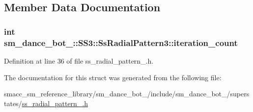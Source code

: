 \subsection{Member Data Documentation}
\subsubsection[{\texorpdfstring{iteration\+\_\+count}{iteration_count}}]{\setlength{\rightskip}{0pt plus 5cm}int sm\+\_\+dance\+\_\+bot\+\_\+::\+S\+S3\+::\+Ss\+Radial\+Pattern3\+::iteration\+\_\+count}\hypertarget{structsm__dance__bot__3_1_1SS3_1_1SsRadialPattern3_a83ff2f4fce867bf0cfb53ec61fc37212}{}\label{structsm__dance__bot__3_1_1SS3_1_1SsRadialPattern3_a83ff2f4fce867bf0cfb53ec61fc37212}


Definition at line 36 of file ss\+\_\+radial\+\_\+pattern\+\_.\+h.



The documentation for this struct was generated from the following file\+:\begin{DoxyCompactItemize}
\item 
smacc\+\_\+sm\+\_\+reference\+\_\+library/sm\+\_\+dance\+\_\+bot\+\_/include/sm\+\_\+dance\+\_\+bot\+\_/superstates/\hyperlink{3_2include_2sm__dance__bot__3_2superstates_2ss__radial__pattern__3_8h}{ss\+\_\+radial\+\_\+pattern\+\_.\+h}\end{DoxyCompactItemize}

